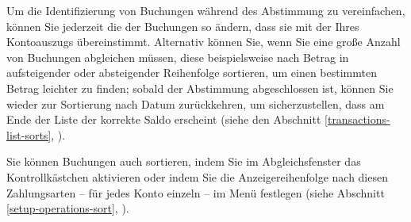 Um die Identifizierung von Buchungen während des Abstimmung zu vereinfachen, können Sie jederzeit die  der Buchungen so ändern, dass sie mit der Ihres Kontoauszugs übereinstimmt. Alternativ können Sie, wenn Sie eine große Anzahl von Buchungen abgleichen müssen, diese beispielsweise nach Betrag in aufsteigender oder absteigender Reihenfolge sortieren, um einen bestimmten Betrag leichter zu finden; sobald der Abstimmung abgeschlossen ist, können Sie wieder zur Sortierung nach Datum zurückkehren, um sicherzustellen, dass am Ende der Liste der korrekte Saldo erscheint (siehe den Abschnitt \vref{transactions-list-sorts}, ).

Sie können Buchungen auch sortieren, indem Sie im Abgleichsfenster das Kontrollkästchen  aktivieren oder indem Sie die Anzeigereihenfolge nach diesen Zahlungsarten – für jedes Konto einzeln – im Menü  festlegen (siehe Abschnitt \vref{setup-operations-sort}, ).

